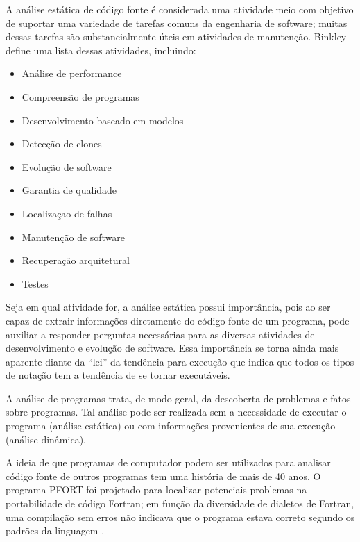 A análise estática de código fonte é considerada uma atividade meio com
objetivo de suportar uma variedade de tarefas comuns da engenharia de
software; muitas dessas tarefas são substancialmente úteis em atividades de
manutenção. Binkley~ define uma lista dessas
atividades, incluindo:

\begin{multicols}{2}
  \begin{itemize}
    \item Análise de performance
    \item Compreensão de programas
    \item Desenvolvimento baseado em modelos
    \item Detecção de clones
    \item Evolução de software
    \item Garantia de qualidade
    \item Localizaçao de falhas
    \item Manutenção de software
    \item Recuperação arquitetural
    \item Testes
  \end{itemize}
\end{multicols}

Seja em qual atividade for, a análise estática possui importância,
pois ao ser capaz de extrair informações diretamente do
código fonte de um programa, pode auxiliar a responder perguntas necessárias
para as diversas atividades de desenvolvimento e evolução de software. Essa
importância se torna ainda mais aparente diante da ``lei'' da tendência para
execução \cite{harman2010why} que indica que todos os tipos de notação tem a
tendência de se tornar executáveis.


A análise de programas trata, de modo geral, da descoberta de problemas e
fatos sobre programas. Tal análise pode ser realizada sem a necessidade de executar o
programa (análise estática) ou com informações provenientes de sua execução
(análise dinâmica).

A ideia de que programas de computador podem ser utilizados para analisar
código fonte de outros programas tem uma história de mais de 40 anos.  O
programa PFORT \cite{ryder1974pfort} foi projetado para localizar potenciais
problemas na portabilidade de código Fortran; em função da diversidade de
dialetos de Fortran, uma compilação sem erros não indicava que o programa
estava correto segundo os padrões da linguagem \cite{wichmann1995industrial}.

